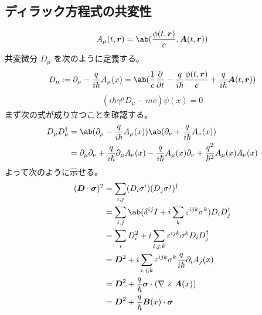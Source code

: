 \documentclass[uplatex,dvipdfmx,a4paper,11pt]{jlreq}
\newcommand{\rr}{\bm{r}}
\newcommand{\vnabla}{\mathbf{\nabla}}
\numberwithin{equation}{section}
\theoremstyle{definition}
\begin{document}
\subsection{ディラック方程式の共変性}
\begin{align}
  A_\mu(t, \rr) = \ab(\frac{\phi(t, \rr)}{c}, \bm{A}(t, \rr))
\end{align}
共変微分 $D_\mu$ を次のように定義する。
\begin{align}
  D_\mu := \partial_\mu - \frac{q}{i\hbar}A_\mu(x) = \ab(\frac{1}{c}\diffp{}{t} - \frac{q}{i\hbar}\frac{\phi(t, \rr)}{c} + \frac{q}{i\hbar}\bm{A}(t, \rr))
\end{align}
\begin{align}
  (i\hbar\gamma^\mu D_\mu - mc)\psi(x) = 0
\end{align}
まず次の式が成り立つことを確認する。
\begin{align}
  D_\mu D_\nu^\dagger & = \ab(\partial_\mu - \frac{q}{i\hbar}A_\mu(x))\ab(\partial_\nu + \frac{q}{i\hbar}A_\nu(x))                                                      \\
                      & = \partial_\mu\partial_\nu + \frac{q}{i\hbar}\partial_\mu A_\nu(x) - \frac{q}{i\hbar}A_\mu(x)\partial_\nu + \frac{q^2}{\hbar^2}A_\mu(x)A_\nu(x)
\end{align}
よって次のように示せる。
\begin{align}
  (\bm{D}\cdot\bm{\sigma})^2 & = \sum_{i,j}(D_i\sigma^i)(D_j\sigma^j)^\dagger                                      \\
                             & = \sum_{i,j}\ab(\delta^{ij}I + i\sum_{k}\varepsilon^{ijk}\sigma^k)D_iD_j^\dagger    \\
                             & = \sum_{i}D_i^2 + i\sum_{i,j,k}\varepsilon^{ijk}\sigma^kD_iD_j^\dagger              \\
                             & = \bm{D}^2 + i\sum_{i,j,k}\varepsilon^{ijk}\sigma^k\frac{q}{i\hbar}\partial_iA_j(x) \\
                             & = \bm{D}^2 + \frac{q}{\hbar}\bm{\sigma}\cdot(\vnabla\times\bm{A}(x))                \\
                             & = \bm{D}^2 + \frac{q}{\hbar}\bm{B}(x)\cdot\bm{\sigma}
\end{align}
\end{document}
